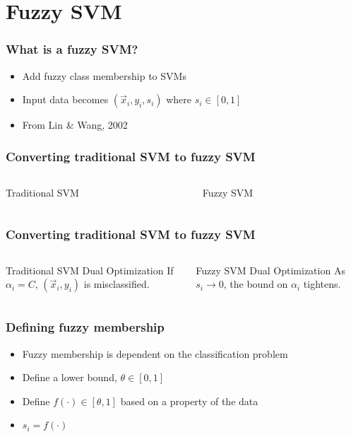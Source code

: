\section{Fuzzy SVM}

\begin{frame}
    \frametitle{What is a fuzzy SVM?}
    \begin{itemize}
        \item Add fuzzy class membership to SVMs
        \item Input data becomes \(\left(\vec{x}_i, y_i, s_i\right)\) where \(s_i \in [0, 1]\)
        \item From Lin \& Wang, 2002 \cite{991432}
    \end{itemize}
\end{frame}

\begin{frame}
    \frametitle{Converting traditional SVM to fuzzy SVM}
    \begin{columns}[T]
        \begin{column}{0.5\textwidth}
            Traditional SVM
            \svmEquation
        \end{column}
        \begin{column}{0.5\textwidth}
            Fuzzy SVM
            \fuzzySvmEquation
        \end{column}
    \end{columns}
\end{frame}

\begin{frame}
    \frametitle{Converting traditional SVM to fuzzy SVM}
    \begin{columns}[T]
        \begin{column}{0.5\textwidth}
            Traditional SVM Dual Optimization
            \traditionalDual
            If \(\alpha_i = C\), \(\left(\vec{x}_i, y_i\right)\) is misclassified.
        \end{column}
        \begin{column}{0.5\textwidth}
            Fuzzy SVM Dual Optimization
            \fuzzyDual
            As \(s_i \to 0\), the bound on \(\alpha_i\) tightens.
        \end{column}
    \end{columns}
\end{frame}

\begin{frame}
    \frametitle{Defining fuzzy membership}
    \begin{itemize}
        \item Fuzzy membership is dependent on the classification problem
        \item Define a lower bound, \(\theta \in [0, 1]\)
        \item Define \(f(\cdot) \in [\theta, 1]\) based on a property of the data
        \item \(s_i = f(\cdot)\)
    \end{itemize}
\end{frame}
